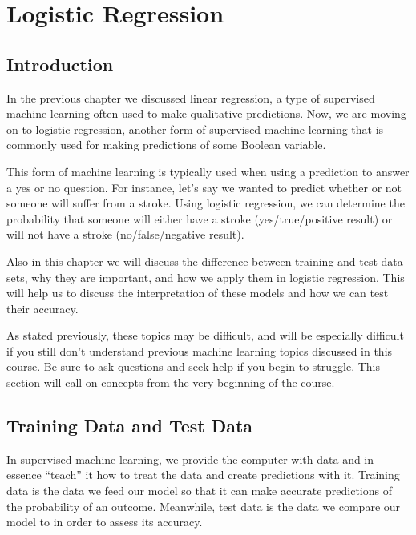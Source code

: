 \documentclass[
]{book}
\begin{document}
\hypertarget{logistic-regression}{%
\chapter{Logistic Regression}\label{logistic-regression}}

\hypertarget{introduction-5}{%
\section{Introduction}\label{introduction-5}}

In the previous chapter we discussed linear regression, a type of supervised machine learning often used to make qualitative predictions. Now, we are moving on to logistic regression, another form of supervised machine learning that is commonly used for making predictions of some Boolean variable.

This form of machine learning is typically used when using a prediction to answer a yes or no question. For instance, let's say we wanted to predict whether or not someone will suffer from a stroke. Using logistic regression, we can determine the probability that someone will either have a stroke (yes/true/positive result) or will not have a stroke (no/false/negative result).

Also in this chapter we will discuss the difference between training and test data sets, why they are important, and how we apply them in logistic regression. This will help us to discuss the interpretation of these models and how we can test their accuracy.

As stated previously, these topics may be difficult, and will be especially difficult if you still don't understand previous machine learning topics discussed in this course. Be sure to ask questions and seek help if you begin to struggle. This section will call on concepts from the very beginning of the course.

\hypertarget{training-data-and-test-data}{%
\section{Training Data and Test Data}\label{training-data-and-test-data}}

In supervised machine learning, we provide the computer with data and in essence ``teach'' it how to treat the data and create predictions with it. Training data is the data we feed our model so that it can make accurate predictions of the probability of an outcome. Meanwhile, test data is the data we compare our model to in order to assess its accuracy.
\end{document}
